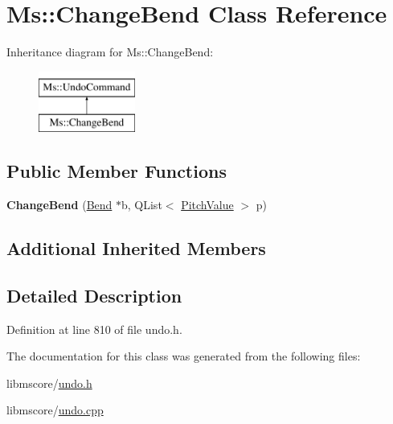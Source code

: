 \hypertarget{class_ms_1_1_change_bend}{}\section{Ms\+:\+:Change\+Bend Class Reference}
\label{class_ms_1_1_change_bend}
Inheritance diagram for Ms\+:\+:Change\+Bend\+:\begin{figure}[H]
\begin{center}
\leavevmode
\includegraphics[height=2.000000cm]{class_ms_1_1_change_bend}
\end{center}
\end{figure}
\subsection*{Public Member Functions}
\begin{DoxyCompactItemize}
\item 
\mbox{\label{class_ms_1_1_change_bend_a8e99b8e0adccc5e8cd0d582cf3103886}} 
{\bfseries Change\+Bend} (\hyperlink{class_ms_1_1_bend}{Bend} $\ast$b, Q\+List$<$ \hyperlink{struct_ms_1_1_pitch_value}{Pitch\+Value} $>$ p)
\end{DoxyCompactItemize}
\subsection*{Additional Inherited Members}


\subsection{Detailed Description}


Definition at line 810 of file undo.\+h.



The documentation for this class was generated from the following files\+:\begin{DoxyCompactItemize}
\item 
libmscore/\hyperlink{undo_8h}{undo.\+h}\item 
libmscore/\hyperlink{undo_8cpp}{undo.\+cpp}\end{DoxyCompactItemize}
